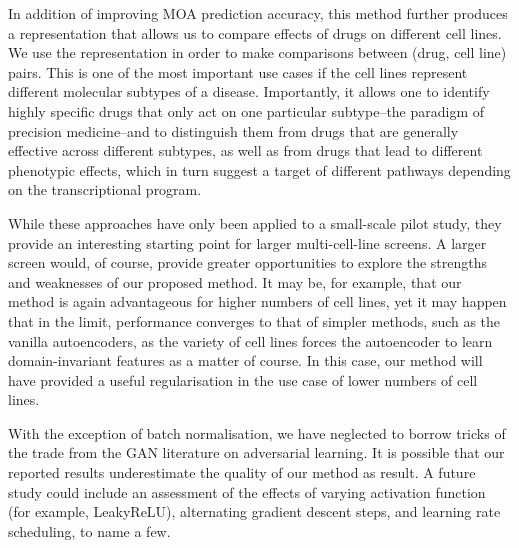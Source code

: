 In addition of improving MOA prediction accuracy, this method further produces a representation that allows us to compare effects of drugs on different cell lines. We use the representation in order to make comparisons between (drug, cell line) pairs. This is one of the most important use cases if the cell lines represent different molecular subtypes of a disease. Importantly, it allows one to identify highly specific drugs that only act on one particular subtype--the paradigm of precision medicine--and to distinguish them from drugs that are generally effective across different subtypes, as well as from drugs that lead to different phenotypic effects, which in turn suggest a target of different pathways depending on the transcriptional program. 

While these approaches have only been applied to a small-scale pilot study, they provide an interesting starting point for larger multi-cell-line screens. A larger screen would, of course, provide greater opportunities to explore the strengths and weaknesses of our proposed method. It may be, for example, that our method is again advantageous for higher numbers of cell lines, yet it may happen that in the limit, performance converges to that of simpler methods, such as the vanilla autoencoders, as the variety of cell lines forces the autoencoder to learn domain-invariant features as a matter of course. In this case, our method will have provided a useful regularisation in the use case of lower numbers of cell lines.

With the exception of batch normalisation, we have neglected to borrow tricks of the trade from the GAN literature on adversarial learning. It is possible that our reported results underestimate the quality of our method as result. A future study could include an assessment of the effects of varying activation function (for example, LeakyReLU), alternating gradient descent steps, and learning rate scheduling, to name a few.

